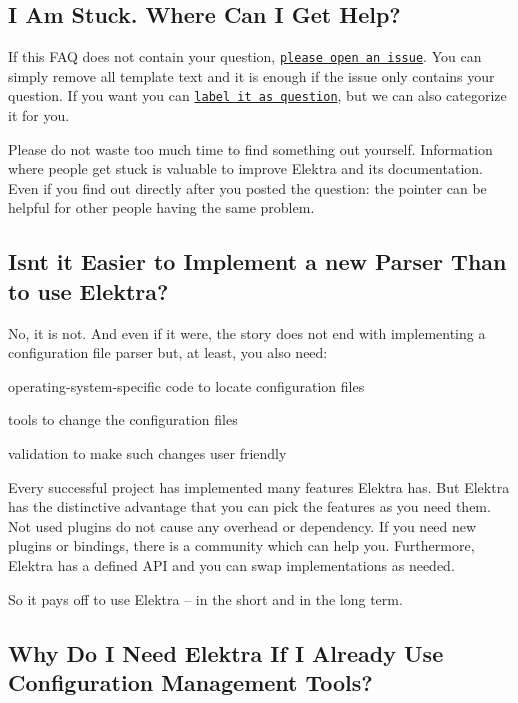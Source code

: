 \subsection*{I Am Stuck. Where Can I Get Help?}

If this F\+AQ does not contain your question, \href{https://git.libelektra.org/issues}{\tt please open an issue}. You can simply remove all template text and it is enough if the issue only contains your question. If you want you can \href{https://git.libelektra.org/issues/labels/question}{\tt label it as question}, but we can also categorize it for you.

Please do not waste too much time to find something out yourself. Information where people get stuck is valuable to improve Elektra and its documentation. Even if you find out directly after you posted the question\+: the pointer can be helpful for other people having the same problem.

\subsection*{Isn\textquotesingle{}t it Easier to Implement a new Parser Than to use Elektra?}

No, it is not. And even if it were, the story does not end with implementing a configuration file parser but, at least, you also need\+:


\begin{DoxyItemize}
\item operating-\/system-\/specific code to locate configuration files
\item tools to change the configuration files
\item validation to make such changes user friendly
\end{DoxyItemize}

Every successful project has implemented many features Elektra has. But Elektra has the distinctive advantage that you can pick the features as you need them. Not used plugins do not cause any overhead or dependency. If you need new plugins or bindings, there is a community which can help you. Furthermore, Elektra has a defined A\+PI and you can swap implementations as needed.

So it pays off to use Elektra -- in the short and in the long term.

\subsection*{Why Do I Need Elektra If I Already Use Configuration Management Tools?}

